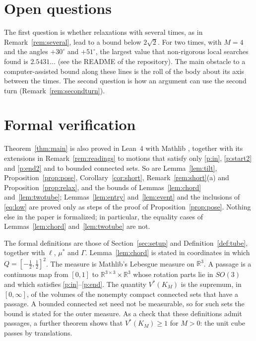 \documentclass[11pt]{amsart}
\theoremstyle{definition}
\theoremstyle{remark}
\numberwithin{equation}{section}
\newcommand{\R}{\mathbb{R}}
\begin{document}
\section{Open questions}\label{sec:open}

The first question is whether relaxations with several times, as in Remark~\ref{rem:several}, lead to a bound below $2\sqrt2$. For two times, with $M=4$ and the angles $+30^\circ$ and $+51^\circ$, the largest value that non-rigorous local searches found is $2.5431\ldots$ (see the README of the repository). The main obstacle to a computer-assisted bound along these lines is the roll of the body about its axis between the times. The second question is how an argument can use the second turn (Remark~\ref{rem:secondturn}).

\appendix
\section{Formal verification}\label{sec:lean}

Theorem~\ref{thm:main} is also proved in Lean~4 \cite{Lean4} with Mathlib \cite{Mathlib}, together with its extensions in Remark~\ref{rem:readings} to motions that satisfy only \ref{p:in}, \ref{p:start2} and \ref{p:end2} and to bounded connected sets. So are Lemma~\ref{lem:tilt}, Proposition~\ref{prop:pose}, Corollary~\ref{cor:short}, Remark~\ref{rem:short}(a) and Proposition~\ref{prop:relax}, and the bounds of Lemmas~\ref{lem:chord} and~\ref{lem:twotube}; Lemmas~\ref{lem:entry} and~\ref{lem:event} and the inclusions of \eqref{eq:low} are proved only as steps of the proof of Proposition~\ref{prop:pose}. Nothing else in the paper is formalized; in particular, the equality cases of Lemmas~\ref{lem:chord} and~\ref{lem:twotube} are not.

The formal definitions are those of Section~\ref{sec:setup} and Definition~\ref{def:tube}, together with $\ell$, $\mu^*$ and $\Gamma$. Lemma~\ref{lem:chord} is stated in coordinates in which $Q=[-\frac12,\frac12]^2$. The measure is Mathlib's Lebesgue measure on $\R^3$. A passage is a continuous map from $[0,1]$ to $\R^{3\times3}\times\R^3$ whose rotation parts lie in $SO(3)$ and which satisfies \ref{p:in}--\ref{p:end}. The quantity $V^*(K_M)$ is the supremum, in $[0,\infty]$, of the volumes of the nonempty compact connected sets that have a passage. A bounded connected set need not be measurable, so for such sets the bound is stated for the outer measure. As a check that these definitions admit passages, a further theorem shows that $V^*(K_M)\ge1$ for $M>0$: the unit cube passes by translations.
\end{document}
